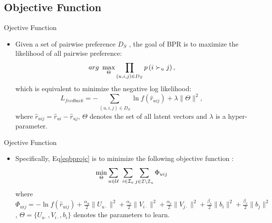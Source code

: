 \subsection*{Objective Function}
\begin{frame}{Ojective Function}
	\begin{itemize}
		\item  Given a set of pairwise preference $D_S$ , the
		goal of BPR is to maximize the likelihood of all pairwise
		preference:
		\begin{equation}
		arg \ \max_{\substack \Theta } \prod_{\left(u,i,j\right) \in D_S} p\left(i \succ_u j\right),
		\end{equation}
		which is equivalent to minimize the negative log likelihood:
		\begin{equation}
		\label{eqbprojc}
		L_{feedback} = - \sum_{\left(u,i,j\right) \in D_S}\ln f \left( \hat{r}_{uij}\right) + \lambda\|\Theta\|^2,
		\end{equation}
		where $\hat{r}_{uij} = \hat{r}_{ui} - \hat{r}_{uj}$, $\Theta$ denotes the set of all latent vectors and $\lambda$ is a hyper-parameter.
	\end{itemize}
\end{frame}

\begin{frame}{Ojective Function}
	\begin{itemize}
		\item Specifically, Eq\eqref{eqbprojc} is to minimize the following objective function  : 
		\begin{equation}
		\min_{\substack\Theta}\sum_{u\in\mathcal{U}}\ \sum_{i\in\mathcal{I}_u}\sum_{j\in\mathcal{I}\setminus\mathcal{I}_u}\Phi_{uij}
		\end{equation}
		where
		$\Phi_{uij}
		= 
		- \ln f \left(\hat{r}_{uij}\right) 
		+ \frac{\alpha_u}{2}\|U_{u\cdot}\|^2
		+ \frac{\alpha_v}{2}\|V_{i\cdot}\|^2
		+ \frac{\alpha_v}{2}\|V_{j\cdot}\|^2
		+ \frac{\beta_v}{2}\|b_{i}\|^2
		+ \frac{\beta_v}{2}\|b_{j}\|^2$, $\Theta = \{U_{u\cdot},V_{i\cdot},b_i\}
		$ denotes the parameters to learn.
	\end{itemize}
\end{frame}



